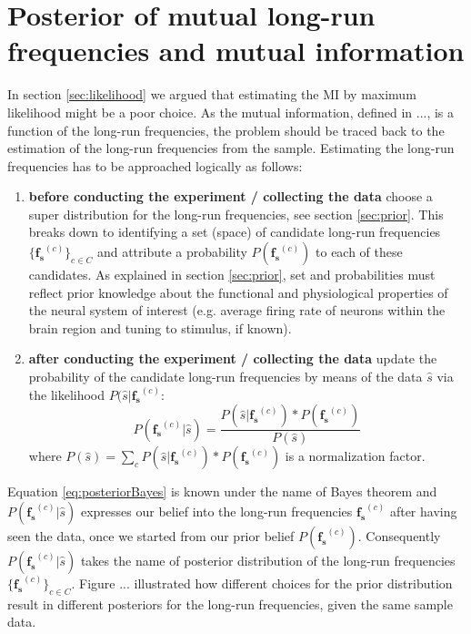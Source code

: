 \section{Posterior of mutual long-run frequencies and mutual information}\label{sec:pos_long-run}


In section \ref{sec:likelihood} we argued that estimating the MI by maximum likelihood might be a poor choice. As the mutual information, defined in ..., is a function of the long-run frequencies, the problem should be traced back to the estimation of the long-run frequencies from the sample. Estimating the long-run frequencies has to be approached logically as follows: 

\begin{enumerate}

\item \textbf{before conducting the experiment / collecting the data} choose a super distribution for the long-run frequencies, see section \ref{sec:prior}. This breaks down to identifying a set (space) of candidate long-run frequencies $\{\mathbf{f_s}^{(c)}\}_{c \in C}$ and attribute a probability $P(\mathbf{f_s}^{(c)})$ to each of these candidates. As explained in section \ref{sec:prior}, set and probabilities must reflect prior knowledge about the functional and physiological properties of the neural system of interest (e.g. average firing rate of neurons within the brain region and tuning to stimulus, if known).

\item \textbf{after conducting the experiment / collecting the data} update the probability of the candidate long-run frequencies by means of the data $\hat{s}$ via the likelihood $P(\hat{s}\vert \mathbf{f_s}^{(c)}$:
\begin{equation}
P(\mathbf{f_s}^{(c)}\vert\hat{s})=\frac{P(\hat{s}\vert \mathbf{f_s}^{(c)})*P(\mathbf{f_s}^{(c)})}{P(\hat{s})}
\label{eq:posteriorBayes}
\end{equation}
where $P(\hat{s})=\sum_c P(\hat{s}\vert \mathbf{f_s}^{(c)})*P(\mathbf{f_s}^{(c)})$ is a normalization factor.

\end{enumerate} 

Equation \eqref{eq:posteriorBayes} is known under the name of Bayes theorem and $P(\mathbf{f_s}^{(c)}\vert\hat{s})$ expresses our belief into the long-run frequencies $\mathbf{f_s}^{(c)}$ after having seen the data, once we started from our prior belief $P(\mathbf{f_s}^{(c)})$. Consequently $P(\mathbf{f_s}^{(c)}\vert\hat{s})$ takes the name of posterior distribution of the long-run frequencies $\{\mathbf{f_s}^{(c)}\}_{c \in C}$.  Figure ... illustrated how different choices for the prior distribution result in different posteriors for the long-run frequencies, given the same sample data.

